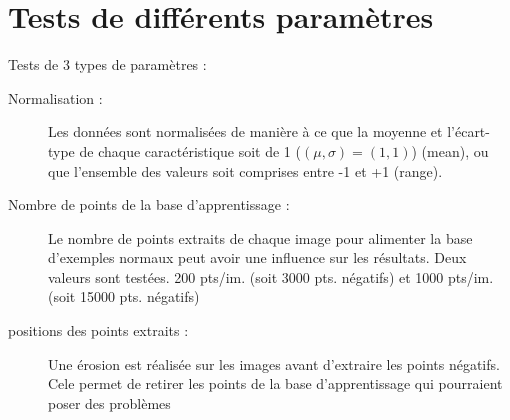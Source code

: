 \section{Tests de différents paramètres}

Tests de 3 types de paramètres : 

\begin{description}
 \item[Normalisation :] Les données sont normalisées de manière à ce que la moyenne et l'écart-type de chaque caractéristique soit de 1 ($(\mu, \sigma)=(1,1)$) (mean), ou que l'ensemble des valeurs soit comprises entre -1 et +1 (range).
 \item[Nombre de points de la base d'apprentissage :] Le nombre de points extraits de chaque image pour alimenter la base d'exemples normaux peut avoir une influence sur les résultats. Deux valeurs sont testées. 200 pts/im. (soit 3000 pts. négatifs) et 1000 pts/im. (soit 15000 pts. négatifs)
 \item[positions des points extraits :] Une érosion est réalisée sur les images avant d'extraire les points négatifs. Cele permet de retirer les points de la base d'apprentissage qui pourraient poser des problèmes 
\end{description}

